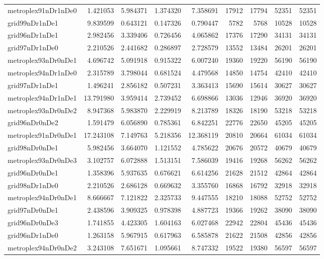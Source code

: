 \begin{longtable}{|l|r|r|r|r|r|r|r|r|}
metroplex91nDr1nDe0 & 1.421053 & 5.984371 & 1.374320 & 7.358691 & 17912 & 17794 & 52351 & 52351 \\
grid99nDr1nDe1 & 9.839599 & 0.643121 & 0.147326 & 0.790447 & 5782 & 5768 & 10528 & 10528 \\
grid96nDr1nDe1 & 2.982456 & 3.339406 & 0.726456 & 4.065862 & 17376 & 17290 & 34131 & 34131 \\
grid97nDr1nDe0 & 2.210526 & 2.441682 & 0.286897 & 2.728579 & 13552 & 13484 & 26201 & 26201 \\
metroplex93nDr0nDe1 & 4.696742 & 5.091918 & 0.915322 & 6.007240 & 19360 & 19220 & 56190 & 56190 \\
metroplex94nDr1nDe0 & 2.315789 & 3.798044 & 0.681524 & 4.479568 & 14850 & 14754 & 42410 & 42410 \\
grid97nDr1nDe1 & 1.496241 & 2.856182 & 0.507231 & 3.363413 & 15690 & 15614 & 30627 & 30627 \\
metroplex94nDr1nDe1 & 13.791980 & 3.959414 & 2.739452 & 6.698866 & 13036 & 12946 & 36920 & 36920 \\
metroplex93nDr0nDe2 & 8.947368 & 5.983870 & 2.229919 & 8.213789 & 18326 & 18190 & 53218 & 53218 \\
grid96nDr0nDe2 & 1.591479 & 6.056890 & 0.785361 & 6.842251 & 22776 & 22650 & 45205 & 45205 \\
metroplex91nDr0nDe1 & 17.243108 & 7.149763 & 5.218356 & 12.368119 & 20810 & 20664 & 61034 & 61034 \\
grid98nDr0nDe1 & 5.982456 & 3.664070 & 1.121552 & 4.785622 & 20676 & 20572 & 40679 & 40679 \\
metroplex93nDr0nDe3 & 3.102757 & 6.072888 & 1.513151 & 7.586039 & 19416 & 19268 & 56262 & 56262 \\
grid96nDr0nDe1 & 1.358396 & 5.937635 & 0.676621 & 6.614256 & 21628 & 21512 & 42864 & 42864 \\
grid98nDr1nDe0 & 2.210526 & 2.686128 & 0.669632 & 3.355760 & 16868 & 16792 & 32918 & 32918 \\
metroplex94nDr0nDe1 & 8.666667 & 7.121822 & 2.325733 & 9.447555 & 18210 & 18088 & 52752 & 52752 \\
grid97nDr0nDe1 & 2.438596 & 3.909325 & 0.978398 & 4.887723 & 19366 & 19262 & 38090 & 38090 \\
grid96nDr0nDe3 & 1.741855 & 4.423305 & 1.604163 & 6.027468 & 22942 & 22804 & 45436 & 45436 \\
grid96nDr1nDe0 & 1.263158 & 5.967915 & 0.617963 & 6.585878 & 21622 & 21508 & 42856 & 42856 \\
metroplex94nDr0nDe2 & 3.243108 & 7.651671 & 1.095661 & 8.747332 & 19522 & 19380 & 56597 & 56597 \\

\end{longtable}
